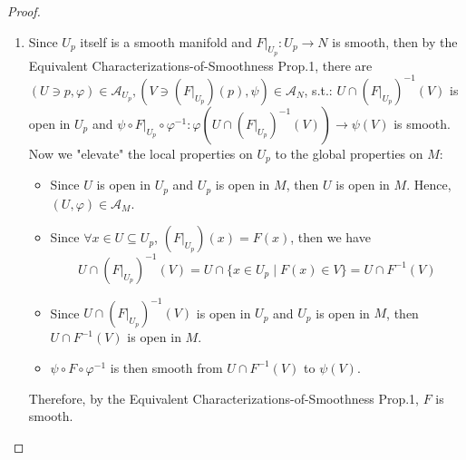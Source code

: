 \begin{proof}
    \begin{enumerate}
        \item Since $U_p$ itself is a smooth manifold and $F|_{U_p}: U_p \to N$ is smooth, then by the Equivalent Characterizations-of-Smoothness Prop.1, there are $(U \ni p, \varphi) \in \mathcal{A}_{U_p}, (V\ni (F|_{U_p})(p), \psi) \in \mathcal{A}_N$, s.t.: $U \cap (F|_{U_p})^{-1} (V)$ is open in $U_p$ and $\psi \circ F|_{U_p} \circ \varphi^{-1} : \varphi (U\cap (F|_{U_p})^{-1} (V)) \to \psi(V)$ is smooth. Now we "elevate" the local properties on $U_p$ to the global properties on $M$:
        \begin{itemize}
            \item Since $U$ is open in $U_p$ and $U_p$ is open in $M$, then $U$ is open in $M$. Hence, $(U,\varphi) \in \mathcal{A}_M$.
            \item Since $\forall x\in U\subseteq U_p$, $(F|_{U_p})(x)=F(x)$, then we have
            \[
            U\cap (F|_{U_p})^{-1} (V)= U\cap \{x\in U_p\mid F(x) \in V\}=U\cap F^{-1} (V)
            \]
            \item Since $U\cap (F|_{U_p})^{-1} (V)$ is open in $U_p$ and $U_p$ is open in $M$, then $U\cap F^{-1}(V)$ is open in $M$.
            \item $\psi \circ F\circ \varphi^{-1}$ is then smooth from $U\cap F^{-1} (V)$ to $\psi(V)$.
        \end{itemize}
        Therefore, by the Equivalent Characterizations-of-Smoothness Prop.1, $F$ is smooth.


\end{enumerate}
\end{proof}
